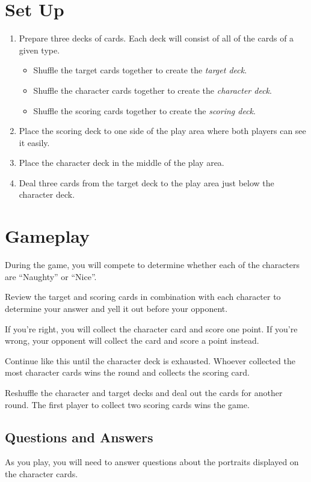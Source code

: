 \documentclass[11pt, parskip=half]{scrartcl}
\begin{document}
\newpage

\section*{Set Up}
\begin{enumerate}[leftmargin=*]
  \item Prepare three decks of cards. Each deck will consist of all of the cards of a given type.
  \begin{itemize}[leftmargin=*]
  	\item Shuffle the target cards together to create the \emph{target deck}.
  	\item Shuffle the character cards together to create the \emph{character deck}.
  	\item Shuffle the scoring cards together to create the \emph{scoring deck}.
  \end{itemize}
  \item Place the scoring deck to one side of the play area where both players can see it easily.
  \item Place the character deck in the middle of the play area.
  \item Deal three cards from the target deck to the play area just below the character deck. 
 \end{enumerate}
 
\newpage
\section*{Gameplay}
During the game, you will compete to determine whether each of the characters are ``Naughty'' or ``Nice''.

Review the target and scoring cards in combination with each character to determine your answer and yell it out before your opponent.

If you're right, you will collect the character card and score one point. If you're wrong, your opponent will collect the card and score a point instead.

Continue like this until the character deck is exhausted. Whoever collected the most character cards wins the round and collects the scoring card.

Reshuffle the character and target decks and deal out the cards for another round. The first player to collect two scoring cards wins the game. 

\subsection*{Questions and Answers}
As you play, you will need to answer questions about the portraits displayed on the character cards.
\end{document}
